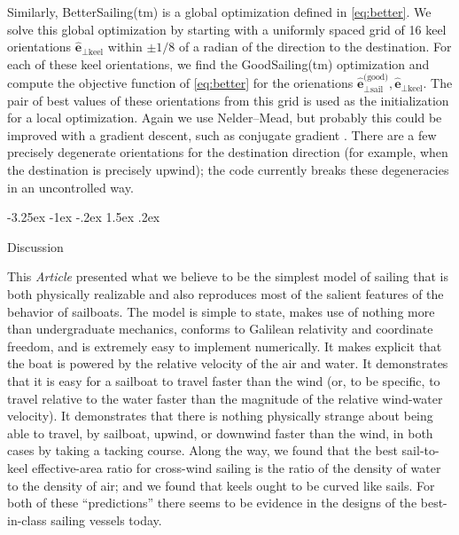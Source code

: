 \documentclass[letterpaper]{article}
\makeatletter
\renewcommand{\vec}[1]{\boldsymbol{#1}}
\newcommand{\uvec}{\vec{\hat{e}}}
\newcommand{\good}{\text{(good)}}
\newcommand{\sail}{\text{sail}}
\newcommand{\keel}{\text{keel}}
\newcommand{\documentname}{\textsl{Article}}
\renewcommand\section{\@startsection {section}{1}{\z@}%
  {-3.25ex \@plus -1ex \@minus -.2ex}%
  {1.5ex \@plus .2ex}%
  {\raggedright\normalfont\large\bfseries}}
\makeatother
\begin{document}
Similarly, BetterSailing(tm) is a global optimization defined in \eqref{eq:better}.
We solve this global optimization by starting with a uniformly spaced grid of 16 keel orientations $\uvec_{\perp\keel}$ within $\pm1/8$ of a radian of the direction to the destination.
For each of these keel orientations, we find the GoodSailing(tm) optimization and compute the objective function of \eqref{eq:better} for the orienations $\uvec^\good_{\perp\sail},\uvec_{\perp\keel}$.
The pair of best values of these orientations from this grid is used as the initialization for a local optimization.
Again we use Nelder--Mead, but probably this could be improved with a gradient descent, such as conjugate gradient \cite{conjugate-gradient}.
There are a few precisely degenerate orientations for the destination direction (for example, when the destination is precisely upwind); the code currently breaks these degeneracies in an uncontrolled way.

\section{Discussion}\label{sec:discussion}

This \documentname{} presented what we believe to be the simplest model of sailing that is both physically realizable and also reproduces most of the salient features of the behavior of sailboats.
The model is simple to state, makes use of nothing more than undergraduate mechanics, conforms to Galilean relativity and coordinate freedom, and is extremely easy to implement numerically.
It makes explicit that the boat is powered by the relative velocity of the air and water.
It demonstrates that it is easy for a sailboat to travel faster than the wind (or, to be specific, to travel relative to the water faster than the magnitude of the relative wind-water velocity).
It demonstrates that there is nothing physically strange about being able to travel, by sailboat, upwind, or downwind faster than the wind, in both cases by taking a tacking course.
Along the way, we found that the best sail-to-keel effective-area ratio for cross-wind sailing is the ratio of the density of water to the density of air; and we found that keels ought to be curved like sails.
For both of these ``predictions'' there seems to be evidence in the designs of the best-in-class sailing vessels today.
\end{document}
